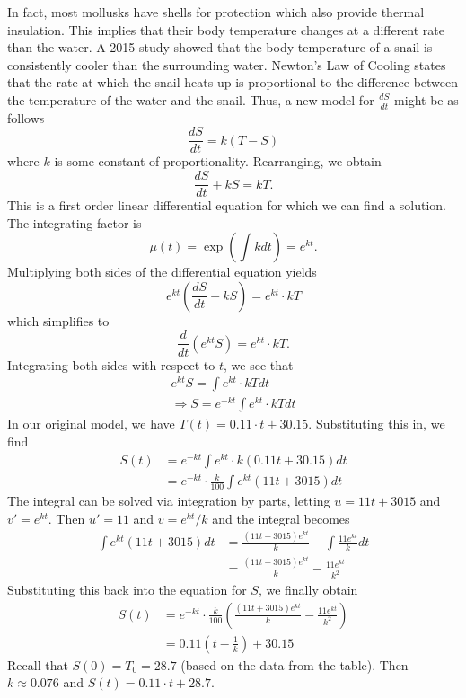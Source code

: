\documentclass{article}
\begin{document}
   In fact, most mollusks have shells for protection which also provide thermal insulation.
   This implies that their body temperature changes at a different rate than the water.
   A 2015 study showed that the body temperature of a snail is consistently cooler than the surrounding water.
   Newton's Law of Cooling states that the rate at which the snail heats up is proportional to the difference between the temperature of the water and the snail.
   Thus, a new model for \(\frac{dS}{dt}\) might be as follows
   \begin{equation*}
     \frac{dS}{dt} = k (T - S)
   \end{equation*}
   where \(k\) is some constant of proportionality.
   Rearranging, we obtain
   \begin{equation*}
     \frac{dS}{dt} + kS = kT.
   \end{equation*}
   This is a first order linear differential equation for which we can find a solution.
   The integrating factor is
   \begin{equation*}
     \mu(t) = \exp \left( \int k dt \right) = e^{kt}.
   \end{equation*}
   Multiplying both sides of the differential equation yields
   \begin{equation*}
     e^{kt} \left( \frac{dS}{dt} + kS \right) = e^{kt} \cdot kT
   \end{equation*}
   which simplifies to
   \begin{equation*}
     \frac{d}{dt} \left( e^{kt} S \right) = e^{kt} \cdot kT.
   \end{equation*}
   Integrating both sides with respect to \(t\), we see that
   \begin{gather*}
     e^{kt} S = \int e^{kt} \cdot kT dt \\
     \Longrightarrow S = e^{-kt} \int e^{kt} \cdot kT dt
   \end{gather*}
   In our original model, we have \(T(t) = 0.11 \cdot t + 30.15\).
   Substituting this in, we find
   \begin{align*}
     S(t) &= e^{-kt} \int e^{kt} \cdot k(0.11t + 30.15) dt \\
     &= e^{-kt} \cdot \frac{k}{100} \int e^{kt} (11t + 3015) dt
   \end{align*}
   The integral can be solved via integration by parts, letting \(u = 11t + 3015\) and \(v' = e^{kt}\). Then \(u' = 11\) and \(v = e^{kt} / k\) and the integral becomes
   \begin{align*}
     \int e^{kt} (11t + 3015) dt &= \frac{(11t + 3015) e^{kt}}{k} - \int \frac{11 e^{kt}}{k} dt \\
     &= \frac{(11t + 3015) e^{kt}}{k} - \frac{11 e^{kt}}{k^{2}}
   \end{align*}
   Substituting this back into the equation for \(S\), we finally obtain
   \begin{align*}
     S(t) &= e^{-kt} \cdot \frac{k}{100} \left( \frac{(11t + 3015) e^{kt}}{k} - \frac{11 e^{kt}}{k^{2}} \right) \\
     &= 0.11 (t - \frac{1}{k}) + 30.15
   \end{align*}
   Recall that \(S(0) = T_{0} = 28.7\) (based on the data from the table).
   Then \(k \approx 0.076\) and \(S(t) = 0.11 \cdot t + 28.7\).
\end{document}

